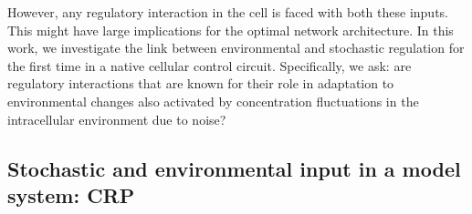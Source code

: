 %
However, any regulatory interaction in the cell is faced with both these inputs.
%
This might have large implications for the optimal network architecture.
%
In this work, we investigate the link between environmental and stochastic regulation for the first time in a native cellular control circuit. %
%
Specifically, we ask:
are regulatory interactions that are known for their role in adaptation to environmental changes also 
activated 
by concentration fluctuations in the intracellular environment due to noise?



\subsection*{Stochastic and environmental input in a model system: CRP}

